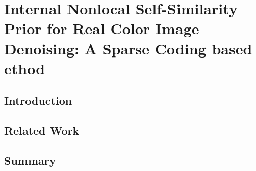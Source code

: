 %
\chapter{Internal Nonlocal Self-Similarity Prior for Real Color Image Denoising: A Sparse Coding based ethod}
\label{sec:internalsc}


\blindtext

\section{Introduction}
\label{sec:real:intro}

\blindtext

\section{Related Work}
\label{sec:real:related}

\blindtext


\section{Summary}
\label{sec:real:summary}

\blindtext
